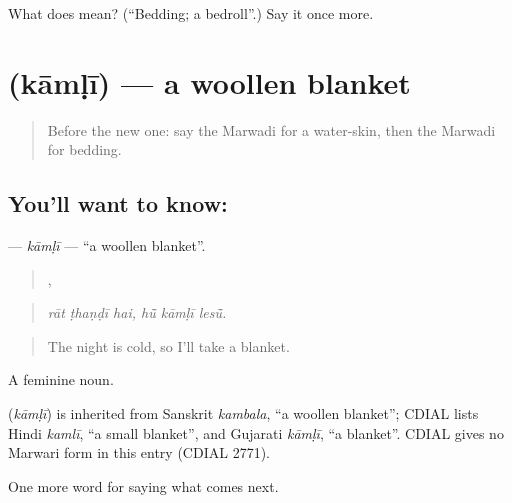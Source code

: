 \begin{tcolorbox}[breakable,colback=teal!4,colframe=teal!35!black,title={Before you move on}]
What does  mean? (\textquotedblleft{}Bedding; a bedroll\textquotedblright{}.) Say it once more.
\end{tcolorbox}
\section[\texorpdfstring{\mw{कामळी} (kāmḷī)}{कामळी (kāmḷī)}]{ (kāmḷī) — a woollen blanket}

\label{lesson:MW-C225-kamli}



\begin{quote}
Before the new one: say the Marwadi for a water-skin, then the Marwadi for bedding.
\end{quote}

\subsection*{You'll want to know: }
\textbf{} — \emph{kāmḷī} — \textquotedblleft{}a woollen blanket\textquotedblright{}.

\begin{quote}
  ,   
\end{quote}

\begin{quote}
\emph{rāt ṭhaṇḍī hai, hū̃ kāmḷī lesū̃.}
\end{quote}

\begin{quote}
The night is cold, so I'll take a blanket.
\end{quote}

A feminine noun.

\begin{cousinweb}
\textbf{} (\emph{kāmḷī}) is inherited from Sanskrit \emph{kambala}, \textquotedblleft{}a woollen blanket\textquotedblright{}; CDIAL lists Hindi \emph{kamlī}, \textquotedblleft{}a small blanket\textquotedblright{}, and Gujarati \emph{kāmḷī}, \textquotedblleft{}a blanket\textquotedblright{}. CDIAL gives no Marwari form in this entry (CDIAL 2771).
\end{cousinweb}

\begin{grammarlens}[title={What you've built}]
One more word for saying what comes next.
\end{grammarlens}


